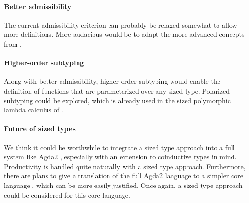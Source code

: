 \paragraph*{Better admissibility}
The current admissibility criterion can probably be relaxed somewhat to allow more definitions.
More audacious would be to adapt the more advanced concepts from \cite{abel:PhD}.
\paragraph*{Higher-order subtyping}
Along with better admissibility, higher-order subtyping would enable the definition of functions that are parameterized over any sized type. Polarized subtyping \cite{steffen:phd} could be explored, which is already used in the sized polymorphic lambda calculus of \cite{abel:PhD}.
\paragraph*{Future of sized types}
We think it could be worthwhile to integrate a sized type approach into a full system like Agda2 \cite{norell:thesis}, especially with an extension to coinductive types in mind. Productivity is handled quite naturally with a sized type approach.
Furthermore, there are plans to give a translation of the full Agda2 language to a simpler core language \cite{mini-tt}, which can be more easily justified. Once again, a sized type approach could be considered for this core language.

